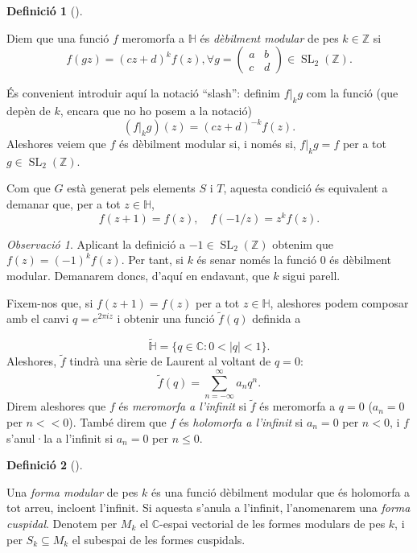 \documentclass[
  letterpaper,
  DIV=11,
  numbers=noendperiod]{scrreprt}
\theoremstyle{plain}
\theoremstyle{plain}
\theoremstyle{definition}
\newtheorem{definition}{Definició}[chapter]
\theoremstyle{plain}
\theoremstyle{plain}
\theoremstyle{definition}
\theoremstyle{remark}
\newtheorem{refremark}{Observació}[chapter]
\begin{document}
\begin{definition}[]\protect\hypertarget{def-debilment-modular}{}\label{def-debilment-modular}

Diem que una funció \(f\) meromorfa a \(\mathbb{H}\) és \emph{dèbilment
modular} de pes \(k\in\mathbb{Z}\) si \[
f(g z) = (cz+d)^k f(z),\forall g=\left(\begin{smallmatrix}a&b\\c&d\end{smallmatrix}\right) \in\operatorname{SL}_2(\mathbb{Z}).
\]

\end{definition}

És convenient introduir aquí la notació ``slash'': definim \(f |_{k} g\)
com la funció (que depèn de \(k\), encara que no ho posem a la notació)
\[
(f |_{k} g)(z) = (cz+d)^{-k} f(z).
\] Aleshores veiem que \(f\) és dèbilment modular si, i només si,
\(f|_{k} g=f\) per a tot \(g\in \operatorname{SL}_2(\mathbb{Z})\).

Com que \(G\) està generat pels elements \(S\) i \(T\), aquesta condició
és equivalent a demanar que, per a tot \(z\in \mathbb{H}\), \[
f(z+1)=f(z),\quad f(-1/z) = z^{k}f(z).
\]

\begin{refremark}
Aplicant la definició a \(-1\in \operatorname{SL}_2(\mathbb{Z})\)
obtenim que \(f(z)=(-1)^k f(z)\). Per tant, si \(k\) és senar només la
funció \(0\) és dèbilment modular. Demanarem doncs, d'aquí en endavant,
que \(k\) sigui parell.

\label{rem-}

\end{refremark}

Fixem-nos que, si \(f(z+1)=f(z)\) per a tot \(z\in \mathbb{H}\),
aleshores podem composar amb el canvi \(q=e^{2\pi i z}\) i obtenir una
funció \(\tilde f(q)\) definida a

\[
\tilde{\mathbb{H}}=\{q\in \mathbb{C}: 0 < |q| < 1 \}.
\] Aleshores, \(\tilde f\) tindrà una sèrie de Laurent al voltant de
\(q=0\): \[
\tilde f(q) = \sum_{n=-\infty}^\infty a_nq^n.
\] Direm aleshores que \(f\) és \emph{meromorfa a l'infinit} si
\(\tilde f\) és meromorfa a \(q=0\) (\(a_n=0\) per \(n<<0\)). També
direm que \(f\) és \emph{holomorfa a l'infinit} si \(a_n=0\) per
\(n < 0\), i \(f\) s'anul·la a l'infinit si \(a_n=0\) per \(n\leq 0\).

\begin{definition}[]\protect\hypertarget{def-forma-modular}{}\label{def-forma-modular}

Una \emph{forma modular} de pes \(k\) és una funció dèbilment modular
que és holomorfa a tot arreu, incloent l'infinit. Si aquesta s'anula a
l'infinit, l'anomenarem una \emph{forma cuspidal}. Denotem per \(M_k\)
el \(\mathbb{C}\)-espai vectorial de les formes modulars de pes \(k\), i
per \(S_k\subseteq M_k\) el subespai de les formes cuspidals.

\end{definition}
\end{document}
